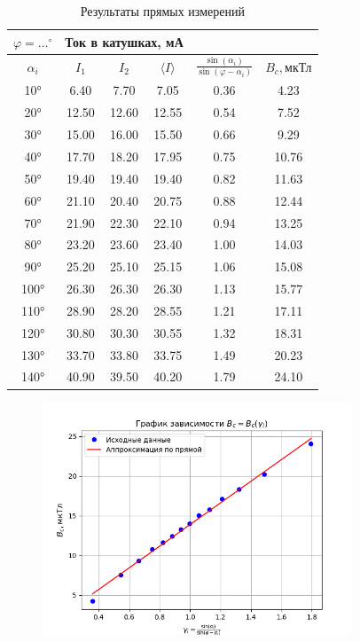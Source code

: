 \documentclass{article}%
\begin{document}
\begin{table}[h!]%
\caption{Результаты прямых измерений}%
\begin{tabular}{|c|c|c|c|c|c|}%
\hline%
$\varphi = \ldots^\circ$&\multicolumn{3}{|c|}{Ток в катушках, мА}&&\\%
\hline%
$\alpha_i$&$I_1$&$I_2$&$\langle I \rangle$&$\frac{\sin (\alpha_i)}{\sin (\varphi - \alpha_i)}$&$B_c, \text{мкТл}$\\%
\hline%
10°&6.40&7.70&7.05&0.36&4.23\\%
\hline%
20°&12.50&12.60&12.55&0.54&7.52\\%
\hline%
30°&15.00&16.00&15.50&0.66&9.29\\%
\hline%
40°&17.70&18.20&17.95&0.75&10.76\\%
\hline%
50°&19.40&19.40&19.40&0.82&11.63\\%
\hline%
60°&21.10&20.40&20.75&0.88&12.44\\%
\hline%
70°&21.90&22.30&22.10&0.94&13.25\\%
\hline%
80°&23.20&23.60&23.40&1.00&14.03\\%
\hline%
90°&25.20&25.10&25.15&1.06&15.08\\%
\hline%
100°&26.30&26.30&26.30&1.13&15.77\\%
\hline%
110°&28.90&28.20&28.55&1.21&17.11\\%
\hline%
120°&30.80&30.30&30.55&1.32&18.31\\%
\hline%
130°&33.70&33.80&33.75&1.49&20.23\\%
\hline%
140°&40.90&39.50&40.20&1.79&24.10\\%
\hline%
\end{tabular}%
\end{table}

%
\newpage%


\begin{figure}%
\centering%
\includegraphics[width=350px]{linear_approximation.png}%
\end{figure}
\end{document}
